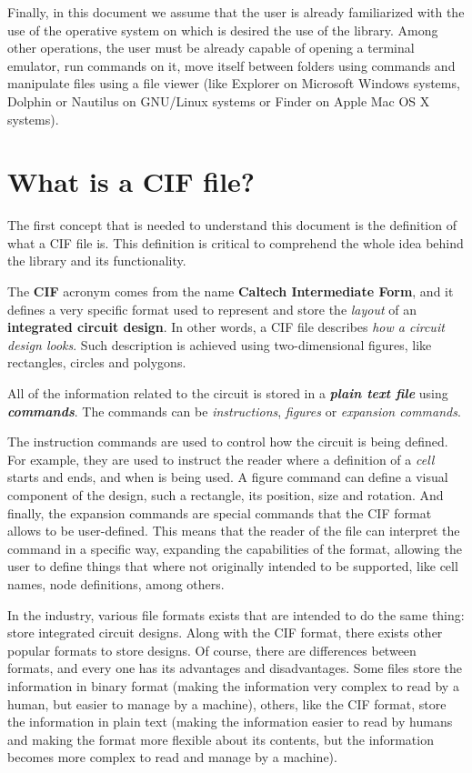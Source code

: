 \documentclass[11pt,twoside,openany,x11names,svgnames]{memoir}
\begin{document}
Finally, in this document we assume that the user is already familiarized with the use of the operative system on which is desired the use of the library. Among other operations, the user must be already capable of opening a terminal emulator, run commands on it, move itself between folders using commands and manipulate files using a file viewer (like Explorer on Microsoft Windows systems, Dolphin or Nautilus on GNU/Linux systems or Finder on Apple Mac OS X systems).

\section{What is a CIF file?}\label{What-is-a-CIF-file}

The first concept that is needed to understand this document is the definition of what a CIF file is. This definition is critical to comprehend the whole idea behind the library and its functionality.

The \textbf{CIF} acronym comes from the name \textbf{Caltech Intermediate Form}, and it defines a very specific format used to represent and store the \textit{layout} of an \textbf{integrated circuit design}. In other words, a CIF file describes \textit{how a circuit design looks}. Such description is achieved using two-dimensional figures, like rectangles, circles and polygons.

All of the information related to the circuit is stored in a \textit{\textbf{plain text file}} using \textit{\textbf{commands}}. The commands can be \textit{instructions}, \textit{figures} or \textit{expansion commands}.

The instruction commands are used to control how the circuit is being defined. For example, they are used to instruct the reader where a definition of a \textit{cell} starts and ends, and when is being used. A figure command can define a visual component of the design, such a rectangle, its position, size and rotation. And finally, the expansion commands are special commands that the CIF format allows to be user-defined. This means that the reader of the file can interpret the command in a specific way, expanding the capabilities of the format, allowing the user to define things that where not originally intended to be supported, like cell names, node definitions, among others.

In the industry, various file formats exists that are intended to do the same thing: store integrated circuit designs. Along with the CIF format, there exists other popular formats to store designs. Of course, there are differences between formats, and every one has its advantages and disadvantages. Some files store the information in binary format (making the information very complex to read by a human, but easier to manage by a machine), others, like the CIF format, store the information in plain text (making the information easier to read by humans and making the format more flexible about its contents, but the information becomes more complex to read and manage by a machine).
\end{document}
